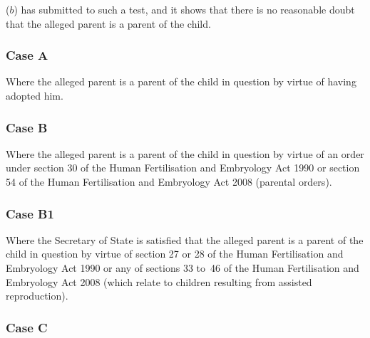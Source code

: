 \documentclass[12pt,a4paper]{article}
\begin{document}
\begin{enumerate}
\begin{enumerate}
($b$) has submitted to such a test, and it shows that there is no reasonable doubt that the alleged parent is a parent of the child.
\end{enumerate}

    \subsubsection*{Case A}

    Where the alleged parent is a parent of the child in question by virtue of having adopted him.

    \subsubsection*{Case B}


Where the alleged parent is a parent of the child in question by virtue of an order under section 30 of the Human Fertilisation and Embryology Act 1990 or section 54 of the Human Fertilisation and Embryology Act 2008 (parental orders).

%

\subsubsection*{Case B1}

Where the Secretary of State is satisfied that the alleged parent is a parent of the child in question by virtue of section 27 or 28 of the Human Fertilisation and Embryology Act 1990 or any of sections 33 to~46 of the Human Fertilisation and Embryology Act 2008 (which relate to children resulting from assisted reproduction).

    \subsubsection*{Case C}


\end{enumerate}
\end{document}
